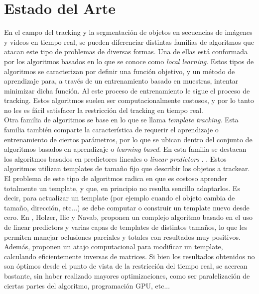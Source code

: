 \documentclass[twocolumn,a4paper,10pt]{article}
\title{}
\date{20 de Septiembre de 2013}
\author{Civile, Juan Pablo \and Crespo, Álvaro \and Ordano, Esteban }
\begin{document}
\pagestyle{fancy}
\maketitle
\thispagestyle{fancy}

%

\section{Estado del Arte}

En el campo del tracking y la segmentación de objetos en secuencias de imágenes y videos en tiempo real, se pueden diferenciar distintas familias de 
algoritmos que atacan este tipo de problemas de diversas formas. Una de ellas está conformada por los algoritmos basados en lo que se conoce como \textit{local learning}.
\cite{local-learning}
Estos tipos de algoritmos se caracterizan por definir una función objetivo, y un método de aprendizaje para, a través de un entrenamiento basado en 
muestras, intentar minimizar dicha función. Al este proceso de entrenamiento le sigue el proceso de tracking. Estos algoritmos suelen ser computacionalmente costosos, y 
por lo tanto no les es fácil satisfacer la restricción del tracking en tiempo real.\\

Otra familia de algoritmos se base en lo que se llama \textit{template tracking}. Esta familia también comparte la característica de requerir el aprendizaje o entrenamiento
de ciertos parámetros, por lo que se ubican dentro del conjunto de algoritmos basados en aprendizaje o \textit{learning based}. En esta familia se destacan los algoritmos 
basados en predictores lineales o 
\textit{linear predictors} \cite{alp} \cite{original-linear-predictors}. 
\cite{CITATION NEEDED}. 
Estos algoritmos utilizan templates de tamaño fijo que describir los objetos a trackear. El problema de este tipo de algoritmos radica en que es costoso aprender 
totalmente un template, y que, en principio no resulta sencillo adaptarlos. Es decir, para actualizar un template (por ejemplo cuando el objeto cambia de tamaño, dirección, etc...)
se debe computar o construir un template nuevo desde cero. En \cite{alp}, Holzer, Ilic y Navab, proponen un complejo algoritmo basado en el uso de linear predictors y varias capas
de templates de distintos tamaños, lo que les permiten manejar oclusiones parciales y totales con resultados muy positivos. Además, proponen un atajo computacional para 
modificar un template, calculando eficientemente inversas de matrices. Si bien los resultados obtenidos no son óptimos desde el punto de vista de la restricción del tiempo real, 
se acercan bastante, sin haber realizado mayores optimizaciones, como ser paralelización de ciertas partes del algoritmo, programación GPU, etc...
\end{document}
